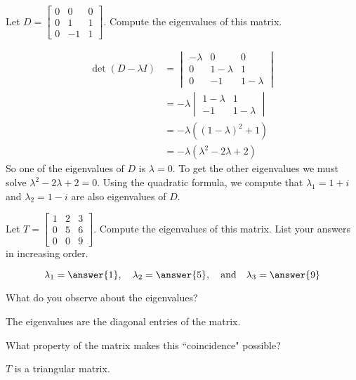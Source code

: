 \documentclass{ximera}
\begin{document}
\begin{example}\label{ex:3x3_complex_eig}
Let $D=\begin{bmatrix} 0&0&0\\ 0 &1&1\\ 0 & -1&1\end{bmatrix}$.  Compute the eigenvalues of this matrix.

\begin{explanation}
\begin{align*}\det(D-\lambda I)&=\begin{vmatrix} -\lambda&0&0\\ 0 &1-\lambda&1\\ 0 & -1&1-\lambda\end{vmatrix}\\
&=-\lambda\begin{vmatrix}1-\lambda&1\\-1&1-\lambda\end{vmatrix}\\
&=-\lambda((1-\lambda)^2+1)\\
&=-\lambda(\lambda^2-2\lambda+2)
\end{align*}
So one of the eigenvalues of $D$ is $\lambda=0$.  To get the other eigenvalues we must solve $\lambda^2-2\lambda+2=0$.  Using the quadratic formula, we compute that $\lambda_1=1+i$ and $\lambda_2=1-i$ are also eigenvalues of $D$.
\end{explanation}
\end{example}

\begin{exploration}\label{init:3x3tri}
Let $T=\begin{bmatrix} 1 & 2 & 3\\ 0 & 5 & 6\\ 0 & 0 & 9\end{bmatrix}$.  Compute the eigenvalues of this matrix.  List your answers in increasing order.

$$\lambda_1=\answer{1},\quad\lambda_2=\answer{5},\quad\text{and}\quad\lambda_3=\answer{9}$$

What do you observe about the eigenvalues?
\begin{hint}
The eigenvalues are the diagonal entries of the matrix.
\end{hint}

What property of the matrix makes this ``coincidence" possible?

\begin{hint}
$T$ is a triangular matrix.
\end{hint}
\end{exploration}
\end{document}
